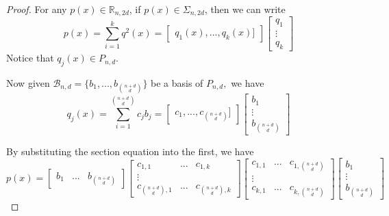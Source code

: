 \documentclass[12pt]{amsart}
\numberwithin{equation}{section}
\theoremstyle{definition}
\numberwithin{thm}{section}
\begin{document}
\begin{proof}
     For any $p(x) \in \mathbb{R}_{n, 2d}$, if $p(x) \in \Sigma_{n, 2d}$, then we can write 
     \begin{equation*}
          p(x) = \sum_{i = 1} ^ k q^2(x) = \begin{bmatrix} q_1(x),... ,q_k(x)] \end{bmatrix}  \begin{bmatrix} q_1 \\ \vdots \\ q_{k} \end{bmatrix}
     \end{equation*}
     Notice that $q_j(x) \in P_{n, d}.$ 
     
     Now given $\mathcal{B}_{n, d} = \{b_1, ..., b_{n + d \choose d}\}$ be a basis of $P_{n, d},$ 
     we have 
     \begin{equation*} q_j(x) = \sum_{i = 1}^{n + d \choose d} c_j b_j = \begin{bmatrix} c_1,..., c_{n + d \choose d}] \end{bmatrix} \begin{bmatrix} b_1 \\ \vdots \\ b_{n + d \choose d} \end{bmatrix} \end{equation*}

     By substituting the section equation into the first, we have
     \begin{equation*}
          p(x) = 
               \begin{bmatrix} b_1 & ...& b_{n + d \choose d}
               \end{bmatrix} 
               \begin{bmatrix}
               c_{1,1} & ... & c_{1,k} \\
               \vdots\\
               c_{{n + d \choose d},1} & ... & c_{{n + d \choose d},k}
               \end{bmatrix}
               \begin{bmatrix}
                    c_{1,1} & ... & c_{1,{n + d \choose d}} \\
                    \vdots\\
                    c_{k,1} & ... & c_{k, {n + d \choose d}}
               \end{bmatrix}
               \begin{bmatrix} b_1 \\ \vdots \\ b_{n + d \choose d}
               \end{bmatrix} 
     \end{equation*}


\end{proof}
\end{document}
